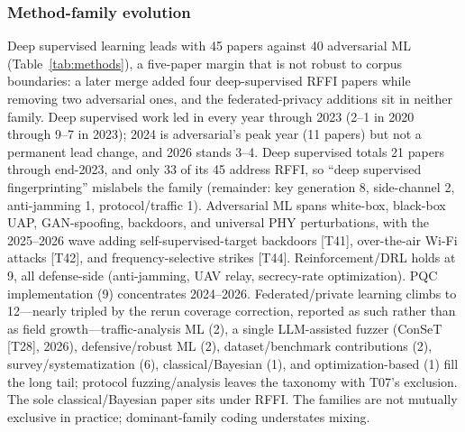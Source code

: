\subsubsection{Method-family evolution}
Deep supervised learning leads with 45 papers against 40 adversarial ML (Table~\ref{tab:methods}), a five-paper margin that is not robust to corpus boundaries: a later merge added four deep-supervised RFFI papers while removing two adversarial ones, and the federated-privacy additions sit in neither family. Deep supervised work led in every year through 2023 (2--1 in 2020 through 9--7 in 2023); 2024 is adversarial's peak year (11 papers) but not a permanent lead change, and 2026 stands 3--4. Deep supervised totals 21 papers through end-2023, and only 33 of its 45 address RFFI, so ``deep supervised fingerprinting'' mislabels the family (remainder: key generation 8, side-channel 2, anti-jamming 1, protocol/traffic 1). Adversarial ML spans white-box, black-box UAP, GAN-spoofing, backdoors, and universal PHY perturbations, with the 2025--2026 wave adding self-supervised-target backdoors [T41], over-the-air Wi-Fi attacks [T42], and frequency-selective strikes [T44]. Reinforcement/DRL holds at 9, all defense-side (anti-jamming, UAV relay, secrecy-rate optimization). PQC implementation (9) concentrates 2024--2026. Federated/private learning climbs to 12---nearly tripled by the rerun coverage correction, reported as such rather than as field growth---traffic-analysis ML (2), a single LLM-assisted fuzzer (ConSeT [T28], 2026), defensive/robust ML (2), dataset/benchmark contributions (2), survey/systematization (6), classical/Bayesian (1), and optimization-based (1) fill the long tail; protocol fuzzing/analysis leaves the taxonomy with T07's exclusion. The sole classical/Bayesian paper sits under RFFI. The families are not mutually exclusive in practice; dominant-family coding understates mixing.

